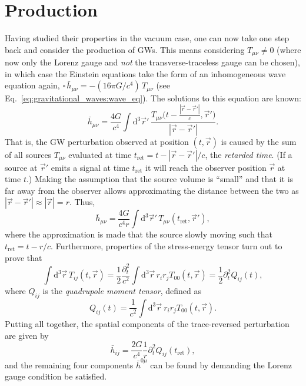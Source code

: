 \section{Production}
\label{sec:gravitational_waves:production}

Having studied their properties in the vacuum case, one can now take one step back and consider the production of GWs. This means considering $T_{\mu\nu} \neq 0$ (where now only the Lorenz gauge and \emph{not} the transverse-traceless gauge can be chosen), in which case the Einstein equations take the form of an inhomogeneous wave equation again, $\square\,\bar{h}_{\mu\nu} = -(16\pi G/c^4)\,T_{\mu\nu}$ (see Eq.~\ref{eq:gravitational_waves:wave_eq}). The solutions to this equation are known:
\begin{equation}
	\bar{h}_{\mu\nu} = \frac{4G}{c^4} 
	\int\mathrm{d}^3\vec{r}'\, 
	\frac{T_{\mu\nu}\bigl(t-\frac{|\vec{r}-\vec{r}'|}{c}, \vec{r}'\bigr)}
	{|\vec{r}-\vec{r}'|}.
\end{equation}
That is, the GW perturbation observed at position $(t, \vec{r})$ is caused by the sum of all sources $T_{\mu\nu}$ evaluated at time $t_\text{ret} = t-|\vec{r}-\vec{r}'|/c$, the \emph{retarded time}. (If a source at $\vec{r}'$ emits a signal at time $t_\text{ret}$ it will reach the observer position $\vec{r}$ at time $t$.) Making the assumption that the source volume is \enquote{small} and that it is far away from the observer allows approximating the distance between the two as $|\vec{r}-\vec{r}'| \approx |\vec{r}| = r$.
Thus, 
\begin{equation}
	\bar{h}_{\mu\nu} = \frac{4G}{c^4r} \int\mathrm{d}^3\vec{r}'\, 
	T_{\mu\nu}(t_\text{ret}, \vec{r}'),
\end{equation}
where the approximation is made that the source slowly moving such that $t_\text{ret} = t-r/c$. %
Furthermore, properties of the stress-energy tensor turn out to prove that
\begin{equation}
	\int\mathrm{d}^3\vec{r}\,T_{ij}(t, \vec{r}) 
	= \frac{1}{2}\frac{\partial_t^2}{c^2}\int\mathrm{d}^3\vec{r}\, r_ir_jT_{00}(t, \vec{r}) 
	= \frac{1}{2}\partial_t^2 Q_{ij}(t),
\end{equation}
where $Q_{ij}$ is the \emph{quadrupole moment tensor}, defined as
\begin{equation}
	Q_{ij}(t) = \frac{1}{c^2}\int\mathrm{d}^3\vec{r}\ r_ir_jT_{00}(t, \vec{r}).
\end{equation}
Putting all together, the spatial components of the trace-reversed perturbation are given by
\begin{equation}
	\label{eq:gravitational_waves:quadrupole_formula}
	\bar{h}_{ij} = \frac{2G}{c^4}\frac{1}{r}\partial_t^2Q_{ij}(t_\text{ret}),
\end{equation}
and the remaining four components $\bar{h}^{0\mu}$ can be found by demanding the Lorenz gauge condition be satisfied. 

